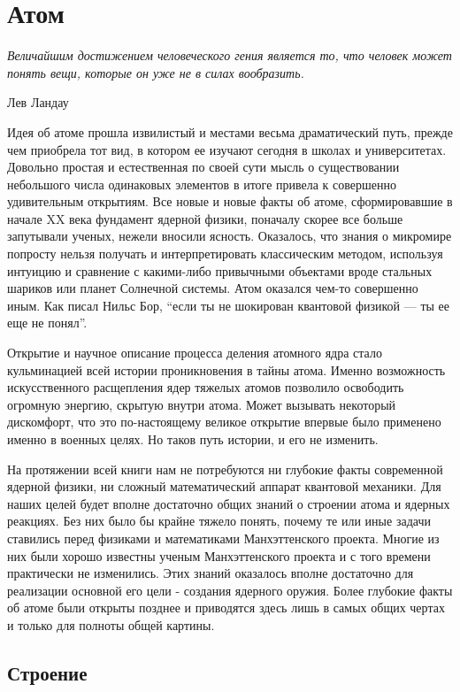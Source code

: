 \chapter{Атом}\label{ch:atom}

\epigraph{\emph{Величайшим достижением человеческого гения является то, что человек может понять вещи, которые он уже не в силах вообразить.}}
{Лев Ландау}

Идея об атоме прошла извилистый и местами весьма драматический путь, прежде чем приобрела тот вид, в котором ее изучают сегодня в школах и университетах.
Довольно простая и естественная по своей сути мысль о существовании небольшого числа одинаковых элементов в итоге привела к совершенно удивительным открытиям.
Все новые и новые факты об атоме, сформировавшие в начале XX века фундамент ядерной физики, поначалу скорее все больше запутывали ученых, нежели вносили ясность.
Оказалось, что знания о микромире попросту нельзя получать и интерпретировать классическим методом, используя интуицию и сравнение с какими-либо привычными объектами вроде стальных шариков или планет Солнечной системы.
Атом оказался чем-то совершенно иным.
Как писал Нильс Бор, ``если ты не шокирован квантовой физикой — ты ее еще не понял''.

Открытие и научное описание процесса деления атомного ядра стало кульминацией всей истории проникновения в тайны атома. 
Именно возможность искусственного расщепления ядер тяжелых атомов позволило освободить огромную энергию, скрытую внутри атома.
Может вызывать некоторый дискомфорт, что это по-настоящему великое открытие впервые было применено именно в военных целях.
Но таков путь истории, и его не изменить.

На протяжении всей книги нам не потребуются ни глубокие факты современной ядерной физики, ни сложный математический аппарат квантовой механики.
Для наших целей будет вполне достаточно общих знаний о строении атома и ядерных реакциях.
Без них было бы крайне тяжело понять, почему те или иные задачи ставились перед физиками и математиками Манхэттенского проекта.
Многие из них были хорошо известны ученым Манхэттенского проекта и с того времени практически не изменились.  
Этих знаний оказалось вполне достаточно для реализации основной его цели - создания ядерного оружия.
Более глубокие факты об атоме были открыты позднее и приводятся здесь лишь в самых общих чертах и только для полноты общей картины.


\section*{Строение}

